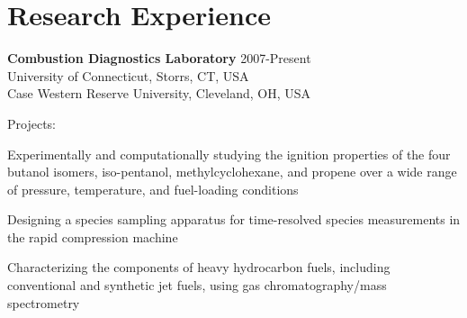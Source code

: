 \vspace{0.1in}

\section{Research Experience}

\textbf{\large Combustion Diagnostics Laboratory} \hfill 2007-Present\\
University of Connecticut, Storrs, CT, USA\\
Case Western Reserve University, Cleveland, OH, USA
\begin{outerlist}
\item[] Projects:
   \begin{innerlist}
   \item Experimentally and computationally studying the ignition
         properties of the four butanol isomers, iso-pentanol, 
         methylcyclohexane, and propene over a wide range of pressure,
         temperature, and fuel-loading conditions
   \item Designing a species sampling apparatus for time-resolved
         species measurements in the rapid compression machine
   \item Characterizing the components of heavy hydrocarbon fuels,
         including conventional and synthetic jet fuels, using gas 
         chromatography/mass spectrometry
   \end{innerlist}

\end{outerlist}

